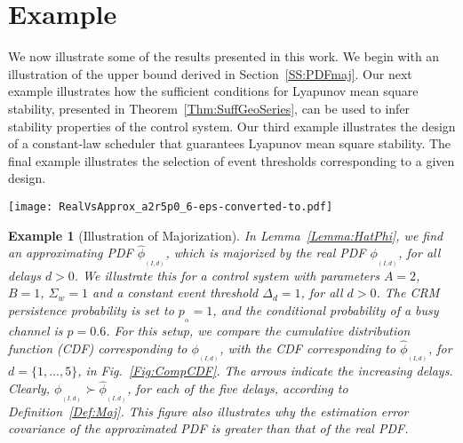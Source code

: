 \documentclass[twocolumn]{autart}
\newtheorem{example}{Example}[section]
\begin{document}
\section{Example} \label{S:Sim}

We now illustrate some of the results presented in this work. We begin with an illustration of the upper bound derived in Section~\ref{SS:PDFmaj}. Our next example illustrates how the sufficient conditions for Lyapunov mean square stability, presented in Theorem~\ref{Thm:SuffGeoSeries}, can be used to infer stability properties of the control system. Our third example illustrates the design of a constant-law scheduler that guarantees Lyapunov mean square stability. The final example illustrates the selection of event thresholds corresponding to a given design.

\begin{figure*}[ptb]
\begin{center}
\texttt{[image: RealVsApprox\_a2r5p0\_6-eps-converted-to.pdf]}
\caption{The approximate PDF in Lemma~\ref{Lemma:HatPhi} is majorized by the actual PDF, as seen in this comparison of the CDFs. The approximate distribution has a larger variance, and is an upper bound for the actual variance. }
\label{Fig:CompCDF}
\end{center}
\end{figure*}

\begin{example}[Illustration of Majorization] \label{Ex:MajPDF}
In Lemma~\ref{Lemma:HatPhi}, we find an approximating PDF $\hat{\phi}_{_{(I,d)}}$, which is majorized by the real PDF $\phi_{_{(I,d)}}$, for all delays $d>0$. We illustrate this for a control system with parameters $A=2$, $B=1$, $\Sigma_w = 1$ and a constant event threshold $\Delta_d=1$, for all $d>0$. The CRM persistence probability is set to $p_{_{\alpha}}=1$, and the conditional probability of a busy channel is $p=0.6$. For this setup, we compare the cumulative distribution function (CDF) corresponding to $\phi_{_{(I,d)}}$, with the CDF corresponding to $\hat{\phi}_{_{(I,d)}}$, for $d=\{1,\dots,5\}$, in Fig.~\ref{Fig:CompCDF}. The arrows indicate the increasing delays. Clearly, $\phi_{_{(I,d)}} \succ \hat{\phi}_{_{(I,d)}}$, for each of the five delays, according to Definition~\ref{Def:Maj}. This figure also illustrates why the estimation error covariance of the approximated PDF is greater than that of the real PDF.
\end{example}
\end{document}
